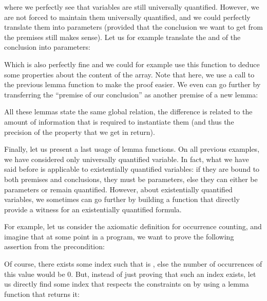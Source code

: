 


where we perfectly see that variables are still universally quantified. However,
we are not forced to maintain them universally quantified, and we could
perfectly translate them into parameters (provided that the conclusion we want
to get from the premises still makes sense). Let us for example translate the
 and  of the conclusion into parameters:






Which is also perfectly fine and we could for example use this function to
deduce some properties about the content of the array. Note that here, we use a
call to the previous lemma function to make the proof easier. We even can go
further by transferring the ``premise of our conclusion'' as another premise of
a new lemma:






All these lemmas state the same global relation, the difference is related to
the amount of information that is required to instantiate them (and thus the
precision of the property that we get in return).



Finally, let us present a last usage of lemma functions. On all previous
examples, we have considered only universally quantified variable. In fact, what
we have said before is applicable to existentially quantified variables: if they
are bound to both premises and conclusions, they must be parameters, else they
can either be parameters or remain quantified. However, about existentially
quantified variables, we sometimes can go further by building a function that
directly provide a witness for an existentially quantified formula.



For example, let us consider the axiomatic definition for occurrence counting,
and imagine that at some point in a program, we want to prove the following
assertion from the precondition:






Of course, there exists some index  such that 
is , else the number of occurrences of this value would be $0$.
But, instead of just proving that such an index exists, let us directly find
some index that respects the constraints on  by using a lemma
function that returns it:



